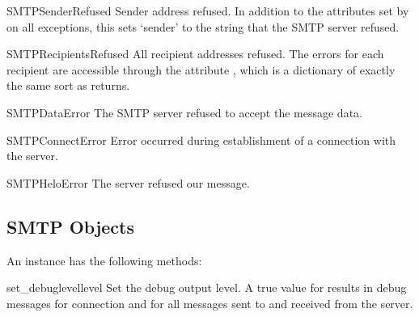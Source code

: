 \begin{excdesc}{SMTPSenderRefused}
  Sender address refused.  In addition to the attributes set by on all 
   exceptions, this sets `sender' to
  the string that the SMTP server refused.
\end{excdesc}

\begin{excdesc}{SMTPRecipientsRefused}
  All recipient addresses refused.  The errors for each recipient are
  accessible through the attribute , which is a
  dictionary of exactly the same sort as 
  returns.
\end{excdesc}

\begin{excdesc}{SMTPDataError}
  The SMTP server refused to accept the message data.
\end{excdesc}

\begin{excdesc}{SMTPConnectError}
  Error occurred during establishment of a connection  with the server.
\end{excdesc}

\begin{excdesc}{SMTPHeloError}
  The server refused our  message.
\end{excdesc}


\begin{seealso}
\end{seealso}


\subsection{SMTP Objects \label{SMTP-objects}}

An  instance has the following methods:

\begin{methoddesc}{set_debuglevel}{level}
Set the debug output level.  A true value for  results in
debug messages for connection and for all messages sent to and
received from the server.
\end{methoddesc}


